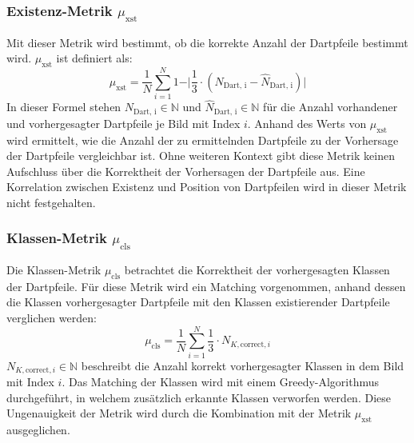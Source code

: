 \subsubsection{Existenz-Metrik $\mu_\text{xst}$}

Mit dieser Metrik wird bestimmt, ob die korrekte Anzahl der Dartpfeile bestimmt wird. $\mu_\text{xst}$ ist definiert als:
\begin{equation*}
    \mu_\text{xst} = \frac{1}{N} \sum_{i=1}^{N}1 - \vert \frac{1}{3} \cdot ( N_\text{Dart, i} - \widehat{N}_\text{Dart, i} ) \vert
\end{equation*}
In dieser Formel stehen $N_\text{Dart, i} \in \mathbb{N}$ und $\widehat{N}_\text{Dart, i} \in \mathbb{N}$ für die Anzahl vorhandener und vorhergesagter Dartpfeile je Bild mit Index $i$. Anhand des Werts von $\mu_\text{xst}$ wird ermittelt, wie die Anzahl der zu ermittelnden Dartpfeile zu der Vorhersage der Dartpfeile vergleichbar ist. Ohne weiteren Kontext gibt diese Metrik keinen Aufschluss über die Korrektheit der Vorhersagen der Dartpfeile aus. Eine Korrelation zwischen Existenz und Position von Dartpfeilen wird in dieser Metrik nicht festgehalten.

\subsubsection{Klassen-Metrik $\mu_\text{cls}$}

Die Klassen-Metrik $\mu_\text{cls}$ betrachtet die Korrektheit der vorhergesagten Klassen der Dartpfeile. Für diese Metrik wird ein Matching vorgenommen, anhand dessen die Klassen vorhergesagter Dartpfeile mit den Klassen existierender Dartpfeile verglichen werden:
\begin{equation*}
    \mu_\text{cls} = \frac{1}{N}\sum_{i=1}^{N} \frac{1}{3} \cdot N_{K, \text{correct}, i}
\end{equation*}
$N_{K, \text{correct}, i} \in \mathbb{N}$ beschreibt die Anzahl korrekt vorhergesagter Klassen in dem Bild mit Index $i$. Das Matching der Klassen wird mit einem Greedy-Algorithmus durchgeführt, in welchem zusätzlich erkannte Klassen verworfen werden. Diese Ungenauigkeit der Metrik wird durch die Kombination mit der Metrik $\mu_\text{xst}$ ausgeglichen.

